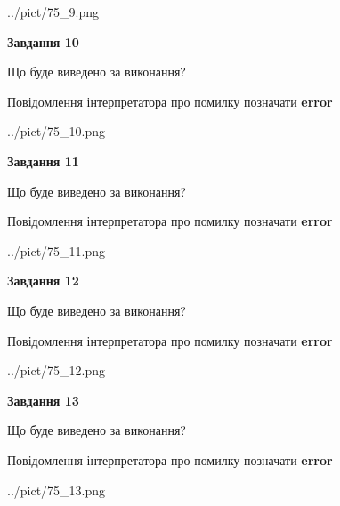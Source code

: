 \documentclass[11pt, ukrainian]{article}
\begin{document}
{\begin {large}
\begin{center}
	{../pict/75_9.png}
\end{center}
\newpage

{\begin {center}\textbf{Завдання 10}\end {center}}\par
Що буде виведено за виконання? \par
Повідомлення інтерпретатора про помилку позначати \textbf{error}

\begin{center}
	{../pict/75_10.png}
\end{center}
\newpage

{\begin {center}\textbf{Завдання 11}\end {center}}\par
Що буде виведено за виконання? \par
Повідомлення інтерпретатора про помилку позначати \textbf{error}

\begin{center}
	{../pict/75_11.png}
\end{center}
\newpage

{\begin {center}\textbf{Завдання 12}\end {center}}\par
Що буде виведено за виконання? \par
Повідомлення інтерпретатора про помилку позначати \textbf{error}

\begin{center}
	{../pict/75_12.png}
\end{center}
\newpage

{\begin {center}\textbf{Завдання 13}\end {center}}\par
Що буде виведено за виконання? \par
Повідомлення інтерпретатора про помилку позначати \textbf{error}

\begin{center}
	{../pict/75_13.png}
\end{center}
\newpage


\end{large}}
\end{document}
